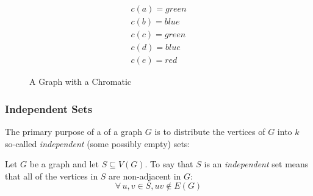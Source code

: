 \begin{figure}[h]
  \label{fig:exchromatic}
  \begin{minipage}[t]{3in}
    \begin{center}
      \vspace{0in}
    \end{center}
  \end{minipage}
  \begin{minipage}[t]{3in}
    \begin{gather*}
      c(a)=green \\
      c(b)=blue \\
      c(c)=green \\
      c(d)=blue \\
      c(e)=red
    \end{gather*}
  \end{minipage}
  \caption{A Graph with a Chromatic }
\end{figure}

\subsubsection{Independent Sets}

The primary purpose of a  of a graph \(G\) is to distribute the vertices of \(G\) into \(k\) so-called
\emph{independent} (some possibly empty) sets:

\begin{definition}
  Let \(G\) be a graph and let \(S\subseteq V(G)\).  To say that \(S\) is an \emph{independent} set means that all of
  the vertices in \(S\) are non-adjacent in \(G\):
  \[\forall\,u,v\in S,uv\notin E(G)\]
\end{definition}

